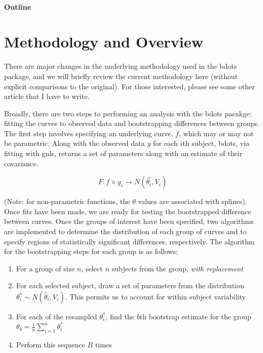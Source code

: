 \documentclass{article}
\begin{document}
\paragraph{Outline}

\section{Methodology and Overview} 

There are major changes in the underlying methodology used in the bdots package, and we will briefly review the current methodology here (without explicit comparisons to the original). For those interested, please see some other article that I have to write.

Broadly, there are two steps to performing an analysis with the bdots pacakge: fitting the curves to observed data and bootstrapping differences between groups. The first step involves specifying an underlying curve, $f$, which may or may not be parametric. Along with the observed data $y$ for each $i$th subject, bdots, via fitting with gnls, returns a set of parameters along with an estimate of their covariance.

\begin{equation}
F: f \times y_i \rightarrow N(\hat{\theta_i}, V_{i})
\end{equation}

(Note: for non-parametric functions, the $\theta$ values are associated with splines). \\

Once fits have been made, we are ready for testing the bootstrapped difference between curves. Once the groups of interest have been specified, two algorithms are implemented to determine the distribution of each group of curves and to specify regions of statistically significant differences, respectively. The algorithm for the bootstrapping steps for each group is as follows:

\begin{enumerate}
\item For a group of size $n$, select $n$ subjects from the group, \textit{with replacement}
\item For each selected subject, draw a set of parameters from the distribution $\theta_{i}^* \sim N(\hat{\theta}_i, V_i)$. This permits us to account for within subject variability
\item For each of the resampled $\theta_i^*$, find the $b$th bootstrap estimate for the group $\theta_b = \frac1n \sum_{i=1}^n \theta_i^*$
\item Perform this sequence $B$ times
\end{enumerate}
\end{document}
